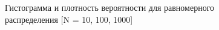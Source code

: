 \begin{itemize}
\begin{figure}[H]
\begin{center}
			\caption{Гистограмма и плотность вероятности для равномерного распределения [N = 10, 100, 1000]} 
		\end{center}
	\end{figure}

\end{itemize}